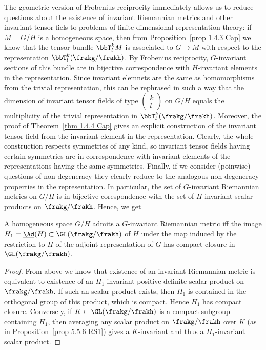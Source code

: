 The geometric version of Frobenius reciprocity immediately allows us to reduce questions about the existence of invariant Riemannian metrics and other invariant tensor fiels to problems of finite-dimensional representation theory: if $M=G\slash H$ is a homogeneous space, then from Proposition~\ref{prop 1.4.3 Cap} we know that the tensor bundle $\bbT^k_lM$ is associated to $G\to M$ with respect to the representation $\bbT^k_l(\frakg\slash \frakh)$. By Frobenius reciprocity, $G$-invariant sections of this bundle are in bijective correspondence with $H$-invariant elements in the representation. Since invariant elemnets are the same as homomorphisms from the trivial representation, this can be rephrased in such a way that the dimension of invariant tensor fields of type $\left(\begin{smallmatrix}k\\l\end{smallmatrix}\right)$
on $G\slash H$ equals the multiplicity of the trivial representation in $\bbT^k_l(\frakg\slash\frakh)$. Moreover, the proof of Theorem~\ref{thm 1.4.4 Cap} gives an explicit construction of the invariant tensor field from the invariant element in the representation. Clearly, the whole construction respects symmetries of any kind, so invariant tensor fields having certain symmetries are in correspondence with invariant elements of the representations having the same symmetries. Finally, if we consider (poinwise) questions of non-degeneracy they clearly reduce to the analogous non-degeneracy properties in the representation. In particular, the set of $G$-invariant Riemannian metrics on $G\slash H$ is in bijective corespondence with the set of $H$-invariant scalar products on $\frakg\slash\frakh$. Hence, we get
\begin{cor}
    A homogeneous space $G\slash H$ admits a $G$-invariant Riemannian metric iff the image $H_1=\underline{\Ad}(H)\subset \GL(\frakg\slash\frakh)$ of $H$ under the map induced by the restriction to $H$ of the adjoint representation of $G$ has compact closure in $\GL(\frakg\slash\frakh)$.
\end{cor}
\begin{proof}
    From above we know that existence of an invariant Riemannian metric is equivalent to existence of an $H_1$-invariant positive definite scalar product on $\frakg\slash\frakh$. If such an scalar product exists, then $H_1$ is contained in the orthogonal group of this  product, which is compact. Hence $H_1$ has compact closure. Conversely, if $K\subset \GL(\frakg\slash\frakh)$ is a compact subgroup containing $H_1$, then averaging any scalar product on $\frakg\slash\frakh$ over $K$ (as in Proposition~\ref{prop 5.5.6 RS1}) gives a $K$-invariant and thus a $H_1$-invariant scalar product.
\end{proof}

